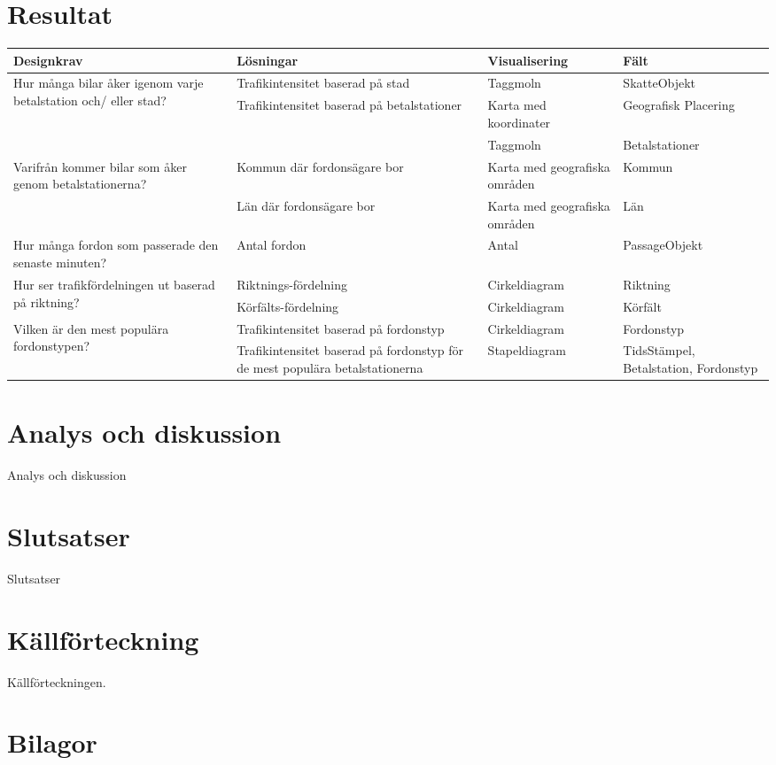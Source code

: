 \documentclass{kththesis}
\begin{document}
\chapter{Resultat}


 \begin{tabular}{|p{3cm}|p{3cm}|p{3cm}|p{3cm}|}
      \hline
     \textbf{Designkrav} & \textbf{Lösningar} & \textbf{Visualisering} & \textbf{Fält}\\
     \hline
  \multirow{3}{3cm}{Hur många bilar åker igenom varje betalstation och/ eller stad?} &  Trafikintensitet baserad på stad & Taggmoln  & SkatteObjekt\\\cline{2-4}
  & \multirow{2}{3cm}{Trafikintensitet baserad på betalstationer} & Karta med koordinater
& Geografisk Placering\\\cline{3-4}  
  & &  Taggmoln
& Betalstationer \\ \hline


  \multirow{2}{3cm}{Varifrån kommer bilar som åker genom betalstationerna?} &  Kommun där fordonsägare bor & Karta med geografiska områden  & Kommun\\\cline{2-4}
  &Län där fordonsägare bor
 & Karta med geografiska områden  & Län\\ \hline
 
Hur många fordon som passerade den senaste minuten? &Antal fordon
 & Antal  & PassageObjekt\\ \hline
 
 \multirow{2}{3cm}{Hur ser trafikfördelningen ut baserad på riktning?} &  Riktnings-fördelning&Cirkeldiagram& Riktning\\\cline{2-4}
  &Körfälts-fördelning 
 & Cirkeldiagram  & Körfält\\ \hline
 
 \multirow{2}{3cm}{Vilken är den mest populära fordonstypen?} &  Trafikintensitet baserad på fordonstyp & Cirkeldiagram& Fordonstyp\\\cline{2-4}
  &Trafikintensitet baserad på fordonstyp för de mest populära betalstationerna 
 & Stapeldiagram  & TidsStämpel, Betalstation, Fordonstyp\\ \hline


\end{tabular}


\chapter{Analys och diskussion}
Analys och diskussion
\blindtext


\chapter{Slutsatser}
Slutsatser
\blindtext

\chapter{Källförteckning}
Källförteckningen.


\chapter{Bilagor}
\end{document}
